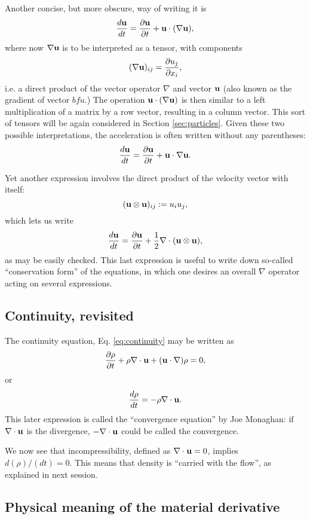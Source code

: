Another concise, but more obscure, way of writing it is
\[
\frac{d \mathbf{u}  }{dt} =
\frac{\partial \mathbf{u} }{\partial t} +
\mathbf{u} \cdot  ( \nabla  \mathbf{u} ) ,
\]
where now $\nabla  \mathbf{u}$ is to be interpreted as a tensor, with
components
\begin{equation}
  \label{eq:nabla_u_def}
  (\nabla  \mathbf{u})_{ij} = \frac{\partial u_j}{\partial x_i} ,
\end{equation}
i.e. a direct product of the vector operator $\nabla$ and vector
$\mathbf{u}$ (also known as the gradient of vector $bfu$.) The operation
$\mathbf{u} \cdot ( \nabla \mathbf{u} )$ is then similar to a left multiplication
of a matrix by a row vector, resulting in a column vector. This sort
of tensors will be again considered in Section \ref{sec:particles}.
Given these two possible interpretations, the acceleration is often
written without any parentheses:
\[
\frac{d \mathbf{u}  }{dt} =
\frac{\partial \mathbf{u} }{\partial t} +
\mathbf{u} \cdot  \nabla  \mathbf{u} .
\]


Yet another expression involves the direct product of the velocity
vector with itself:
\[
( \mathbf{u} \otimes \mathbf{u} )_{ij} := u_i u_j ,
\]
which lets us write
\[
\frac{d \mathbf{u}  }{dt} =
\frac{\partial \mathbf{u} }{\partial t} +
\frac12 \nabla \cdot ( \mathbf{u} \otimes \mathbf{u} ),  
\]
as may be easily checked. This last expression is useful to write down
so-called ``conservation form'' of the equations, in which one desires
an overall $\nabla$ operator acting on several expressions.


\subsection{Continuity, revisited}
\label{sec:continuity2}

The continuity equation, Eq. \ref{eq:continuity} may be written as
\[
\frac{\partial \rho }{\partial t} +
\rho \nabla \cdot \mathbf{u} +
(\mathbf{u} \cdot \nabla) \rho = 0 ,
\]
or
\[
\frac{d \rho }{d t} = 
 - \rho \nabla  \cdot \mathbf{u} .
\]
This later expression is called the ``convergence equation'' by Joe
Monaghan: if $\nabla \cdot \mathbf{u} $ is the divergence, $ - \nabla \cdot
\mathbf{u} $ could be called the convergence.

We now see that incompressibility, defined as $\nabla \cdot \mathbf{u} = 0
$, implies $d(\rho)/(dt) = 0$. This means that density is ``carried
with the flow'', as explained in next session.



\subsection{Physical meaning of the material derivative}



